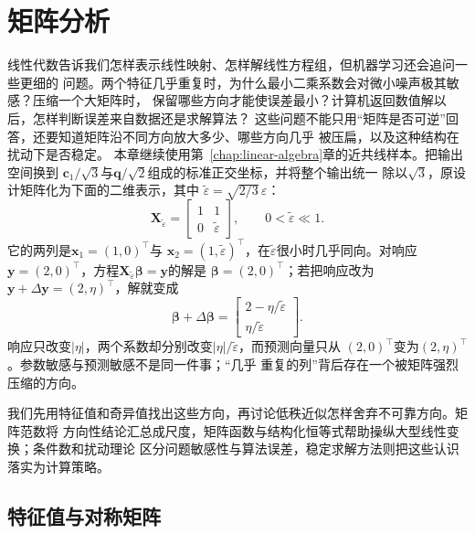 \chapter{矩阵分析}
\label{chap:matrix-analysis}
线性代数告诉我们怎样表示线性映射、怎样解线性方程组，但机器学习还会追问一些更细的
问题。两个特征几乎重复时，为什么最小二乘系数会对微小噪声极其敏感？压缩一个大矩阵时，
保留哪些方向才能使误差最小？计算机返回数值解以后，怎样判断误差来自数据还是求解算法？
这些问题不能只用“矩阵是否可逆”回答，还要知道矩阵沿不同方向放大多少、哪些方向几乎
被压扁，以及这种结构在扰动下是否稳定。
本章继续使用第~\ref{chap:linear-algebra}章的近共线样本。把输出空间换到
\(\bm{c}_1/\sqrt{3}\)与\(\bm{q}/\sqrt{2}\)组成的标准正交坐标，并将整个输出统一
除以\(\sqrt{3}\)，原设计矩阵化为下面的二维表示，其中
\(\widetilde{\varepsilon}=\sqrt{2/3}\,\varepsilon\)：
\begin{equation}
  \bm{X}_{\widetilde{\varepsilon}}=
  \begin{bmatrix}1&1\\0&\widetilde{\varepsilon}\end{bmatrix},
  \qquad 0<\widetilde{\varepsilon}\ll 1.
  \label{eq:matrix-analysis-nearly-collinear-design}
\end{equation}
它的两列是$\bm{x}_1=(1,0)^{\top}$与
$\bm{x}_2=(1,\widetilde{\varepsilon})^{\top}$，在$\widetilde{\varepsilon}$很小时几乎同向。对响应
$\bm{y}=(2,0)^{\top}$，方程$\bm{X}_{\widetilde{\varepsilon}}\bm{\beta}=\bm{y}$的解是
$\bm{\beta}=(2,0)^{\top}$；若把响应改为
$\bm{y}+\Delta\bm{y}=(2,\eta)^{\top}$，解就变成
\begin{equation}
  \bm{\beta}+\Delta\bm{\beta}=
  \begin{bmatrix}2-\eta/\widetilde{\varepsilon}\\ \eta/\widetilde{\varepsilon}\end{bmatrix}.
  \label{eq:matrix-analysis-collinear-coefficient-perturbation}
\end{equation}
响应只改变$|\eta|$，两个系数却分别改变$|\eta|/\widetilde{\varepsilon}$，而预测向量只从
$(2,0)^{\top}$变为$(2,\eta)^{\top}$。参数敏感与预测敏感不是同一件事；“几乎
重复的列”背后存在一个被矩阵强烈压缩的方向。

我们先用特征值和奇异值找出这些方向，再讨论低秩近似怎样舍弃不可靠方向。矩阵范数将
方向性结论汇总成尺度，矩阵函数与结构化恒等式帮助操纵大型线性变换；条件数和扰动理论
区分问题敏感性与算法误差，稳定求解方法则把这些认识落实为计算策略。

\section{特征值与对称矩阵}
\label{sec:matrix-analysis-spectrum}


